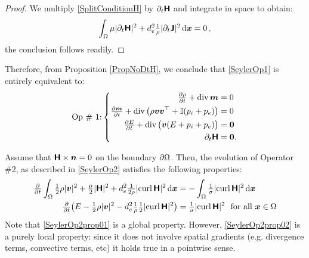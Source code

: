 \documentclass[preprint,1p]{elsarticle}
\begin{document}
\begin{proof} We multiply \eqref{SplitConditionH} by $\partial_t \boldsymbol{\mathsf{H}}$ and
integrate in space to obtain:
\begin{align*}
\int_{\Omega} \mu |\partial_t \boldsymbol{\mathsf{H}}|^2
+ d_e^2 \tfrac{1}{\rho}
|\partial_t\boldsymbol{\mathsf{J}} |^2 \, \mathrm{d}\boldsymbol{x} = 0 \, ,
\end{align*}
the conclusion follows readily.
\end{proof}

Therefore, from Proposition \ref{PropNoDtH}, we conclude that \eqref{SeylerOp1}
is entirely equivalent to:
\begin{align}
\text{Op \# 1:}
\left\{
\begin{aligned}
\tfrac{\partial \rho}{\partial t} + \diver{}\mom &= 0 \\
%
\tfrac{\partial \mom}{\partial t} + \diver{}
\big( \rho \vel\vel^\transp
+ \mathbb{I} (p_i + p_e) \big)
&= 0  \\
%
\tfrac{\partial \totme}{\partial t}
+ \diver{}\big( \vel (\totme + p_i +
p_e) \big)
&= \bzero \\
%
\partial_t \Hfield &= \bzero .
\end{aligned}
\right.
\end{align}

\begin{proposition} Assume that $\boldsymbol{\mathsf{H}}
\times \boldsymbol{n} = 0$ on the boundary $\partial\Omega$. Then, the
evolution of Operator \#2, as described in \eqref{SeylerOp2} satisfies the
following properties:
\begin{align}
\label{SeylerOp2prop01}
\tfrac{\partial}{\partial t}\int_{\domain} \tfrac{1}{2}\rho |\vel|^2
+ \tfrac{\mu}{2} |\Hfield|^2
+ d_e^2 \tfrac{1}{2\rho}|\curl{}\Hfield|^2 \dx
%
&= - \int_{\domain} \tfrac{1}{\conduct} |\curl{}\Hfield|^2  \dx \\
%
\label{SeylerOp2prop02}
\tfrac{\partial }{\partial t} \big( \totme - \tfrac{1}{2}\rho
|\vel|^2 - d_e^2 \tfrac{1}{\rho} \tfrac{1}{2}|\curl{}\Hfield|^2\big)
&= \tfrac{1}{\conduct} |\curl{}\Hfield|^2 \ \ \text{for all }\xcoord \in \domain
\end{align}
Note that \eqref{SeylerOp2prop01} is a global property. However,
\eqref{SeylerOp2prop02} is a purely local property: since it does not involve
spatial gradients (e.g. divergence terms, convective terms, etc) it holds true
in a pointwise sense.
\end{proposition}
\end{document}
